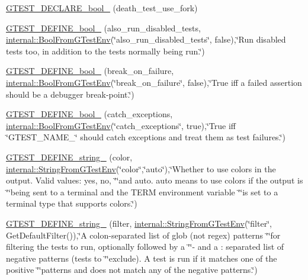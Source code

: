 \begin{DoxyCompactItemize}
\item 
\hyperlink{namespacetesting_a534f0743e7c42c55d27dcd0dd3d38f18}{G\+T\+E\+S\+T\+\_\+\+D\+E\+C\+L\+A\+R\+E\+\_\+bool\+\_\+} (death\+\_\+test\+\_\+use\+\_\+fork)
\item 
\hyperlink{namespacetesting_aaead7d1aa21cf4a222e10e4c91c21ee5}{G\+T\+E\+S\+T\+\_\+\+D\+E\+F\+I\+N\+E\+\_\+bool\+\_\+} (also\+\_\+run\+\_\+disabled\+\_\+tests, \hyperlink{namespacetesting_1_1internal_a67132cdce23fb71b6c38ee34ef81eb4c}{internal\+::\+Bool\+From\+G\+Test\+Env}(\char`\"{}also\+\_\+run\+\_\+disabled\+\_\+tests\char`\"{}, false),\char`\"{}Run disabled tests too, in addition to the tests normally being run.\char`\"{})
\item 
\hyperlink{namespacetesting_a5c9316c2f726f836c50fcfc1065d718c}{G\+T\+E\+S\+T\+\_\+\+D\+E\+F\+I\+N\+E\+\_\+bool\+\_\+} (break\+\_\+on\+\_\+failure, \hyperlink{namespacetesting_1_1internal_a67132cdce23fb71b6c38ee34ef81eb4c}{internal\+::\+Bool\+From\+G\+Test\+Env}(\char`\"{}break\+\_\+on\+\_\+failure\char`\"{}, false),\char`\"{}True iff a failed assertion should be a debugger break-\/point.\char`\"{})
\item 
\hyperlink{namespacetesting_a16f63f28356f1843888013487da9f89d}{G\+T\+E\+S\+T\+\_\+\+D\+E\+F\+I\+N\+E\+\_\+bool\+\_\+} (catch\+\_\+exceptions, \hyperlink{namespacetesting_1_1internal_a67132cdce23fb71b6c38ee34ef81eb4c}{internal\+::\+Bool\+From\+G\+Test\+Env}(\char`\"{}catch\+\_\+exceptions\char`\"{}, true),\char`\"{}True iff \char`\"{}G\+T\+E\+S\+T\+\_\+\+N\+A\+M\+E\+\_\+\char`\"{} should catch exceptions and treat them as test failures.\char`\"{})
\item 
\hyperlink{namespacetesting_a00b4a4eabdef5927208aeabd81220069}{G\+T\+E\+S\+T\+\_\+\+D\+E\+F\+I\+N\+E\+\_\+string\+\_\+} (color, \hyperlink{namespacetesting_1_1internal_a7ed785df46a339403b0f749d3a879201}{internal\+::\+String\+From\+G\+Test\+Env}(\char`\"{}color\char`\"{},\char`\"{}auto\char`\"{}),\char`\"{}Whether to use colors in the output.  Valid values\+: yes, no, \char`\"{}\char`\"{}and auto.  \textquotesingle{}auto\textquotesingle{} means to use colors if the output is \char`\"{}\char`\"{}being sent to a terminal and the T\+E\+R\+M environment variable \char`\"{}\char`\"{}is set to a terminal type that supports colors.\char`\"{})
\item 
\hyperlink{namespacetesting_aa7039e72c7b7041f11d2619c93a934d6}{G\+T\+E\+S\+T\+\_\+\+D\+E\+F\+I\+N\+E\+\_\+string\+\_\+} (filter, \hyperlink{namespacetesting_1_1internal_a7ed785df46a339403b0f749d3a879201}{internal\+::\+String\+From\+G\+Test\+Env}(\char`\"{}filter\char`\"{}, Get\+Default\+Filter()),\char`\"{}A colon-\/separated list of glob (not regex) patterns \char`\"{}\char`\"{}for filtering the tests to run, optionally followed by a \char`\"{}\char`\"{}\textquotesingle{}-\/\textquotesingle{} and a \+: separated list of negative patterns (tests to \char`\"{}\char`\"{}exclude).  A test is run if it matches one of the positive \char`\"{}\char`\"{}patterns and does not match any of the negative patterns.\char`\"{})

\end{DoxyCompactItemize}
